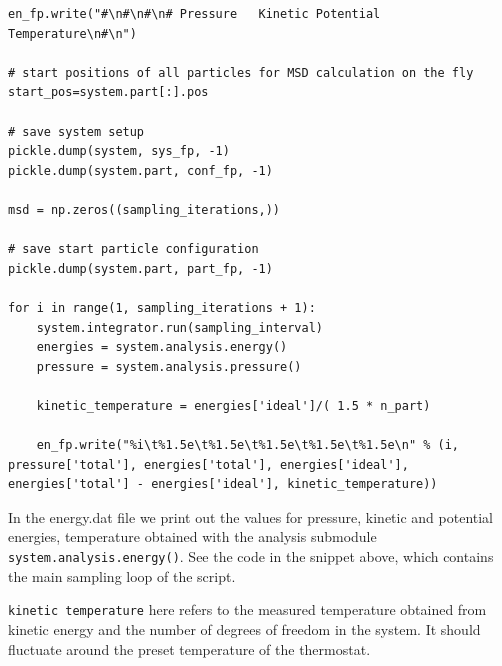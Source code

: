 \documentclass[
paper=a4,                       %
fontsize=11pt,                  %
twoside,                        %
footsepline,                    %
headsepline,                    %
headinclude=false,              %
footinclude=false,              %
pagesize,                       %
]{scrartcl}
\newtheorem{task}{Task}
\begin{document}
{\begin{lstlisting}
en_fp.write("#\n#\n#\n# Pressure   Kinetic Potential   Temperature\n#\n")

# start positions of all particles for MSD calculation on the fly
start_pos=system.part[:].pos

# save system setup
pickle.dump(system, sys_fp, -1)
pickle.dump(system.part, conf_fp, -1)

msd = np.zeros((sampling_iterations,))

# save start particle configuration
pickle.dump(system.part, part_fp, -1)

for i in range(1, sampling_iterations + 1):
    system.integrator.run(sampling_interval)
    energies = system.analysis.energy()
    pressure = system.analysis.pressure()

    kinetic_temperature = energies['ideal']/( 1.5 * n_part)

    en_fp.write("%i\t%1.5e\t%1.5e\t%1.5e\t%1.5e\t%1.5e\n" % (i, pressure['total'], energies['total'], energies['ideal'], energies['total'] - energies['ideal'], kinetic_temperature))
\end{lstlisting}}\vspace{0,2cm}

In the energy.dat file we print out the values for pressure, kinetic
and potential energies, temperature obtained with the analysis submodule
\lstinline|system.analysis.energy()|. See the code in the snippet above, which
contains the main sampling loop of the script.

\noindent \texttt{kinetic temperature} here refers to the measured temperature
obtained from kinetic energy and the number of degrees of freedom in the system. It
should fluctuate around the preset temperature of the thermostat.

\newpage
\vspace{1cm}\vspace{1cm}
\end{document}
